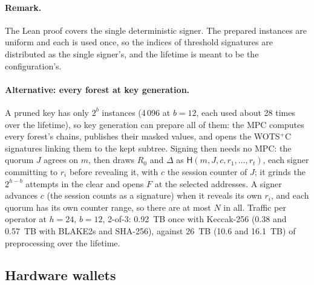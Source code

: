 \documentclass[11pt]{article}
\newcommand{\hash}{\mathsf{H}}
\begin{document}
\paragraph{Remark.} The Lean proof covers the single deterministic signer. The prepared instances are uniform and each
is used once, so the indices of threshold signatures are distributed as the single signer's, and the lifetime is
meant to be the configuration's.

\paragraph{Alternative: every forest at key generation.} A pruned key has only $2^b$ instances (4\,096 at $b=12$,
each used about 28 times over the lifetime), so key generation can prepare all of them: the MPC computes every
forest's chains, publishes their masked values, and opens the WOTS$^+$C signatures linking them to the kept subtree.
Signing then needs no MPC: the quorum $J$ agrees on $m$, then draws $R_0$ and $\Delta$ as
$\hash(m, J, c, r_1,\dots,r_t)$, each signer committing to $r_i$ before revealing it, with $c$ the session counter of
$J$; it grinds the $2^{h-b}$ attempts in the clear and opens $F$ at the selected addresses. A signer advances $c$ (the
session counts as a signature) when it reveals its own $r_i$, and each quorum has its own counter range, so there are
at most $N$ in all. Traffic per operator at $h=24$, $b=12$, 2-of-3:
0.92~TB once with Keccak-256 (0.38 and 0.57~TB with BLAKE2s and SHA-256), against 26~TB (10.6 and 16.1~TB) of
preprocessing over the lifetime.

\subsection{Hardware wallets}
\label{sec:ledger}
\end{document}
